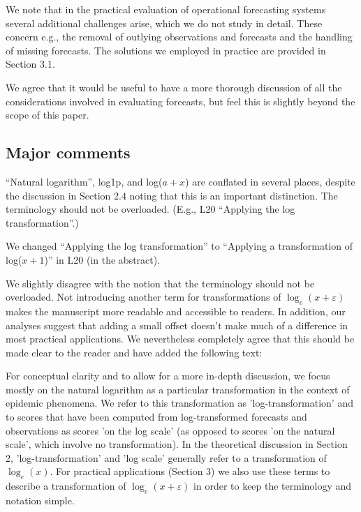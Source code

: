 \documentclass{article}
\newcommand{\black}{\color{black}}
\newcommand{\blue}{\color{blue}}
\newcommand{\indented}{\setlength{\leftskip}{1cm}}
\newcommand{\notindented}{\setlength{\leftskip}{0cm}}
\begin{document}
\indented
We note that in the practical evaluation of operational forecasting systems  several additional challenges arise, which we do not study in detail. These concern e.g., the removal of outlying observations and forecasts and the handling of missing forecasts. The solutions we employed in practice are provided in Section 3.1.
\notindented

We agree that it would be useful to have a more thorough discussion of all the considerations involved in evaluating forecasts, but feel this is slightly beyond the scope of this paper. 

\blue
\subsection{Major comments}

``Natural logarithm'', log1p, and log($a + x$) are conflated in several places, despite the discussion in Section 2.4 noting that this is an important distinction. The terminology should not be overloaded. (E.g., L20 ``Applying the log transformation''.)

\black
We changed ``Applying the log transformation'' to ``Applying a transformation of log($x + 1$)'' in L20 (in the abstract). 

We slightly disagree with the notion that the terminology should not be overloaded. Not introducing another term for transformations of $\log_{e}(x + \varepsilon)$ makes the manuscript more readable and accessible to readers. In addition, our analyses suggest that adding a small offset doesn't make much of a difference in most practical applications. We nevertheless completely agree that this should be made clear to the reader and have added the following text: 

\indented
For conceptual clarity and to allow for a more in-depth discussion, we focus mostly on the natural logarithm as a particular transformation in the context of epidemic phenomena. We refer to this transformation as 'log-transformation' and to scores that have been computed from log-transformed forecasts and observations as scores 'on the log scale' (as opposed to scores 'on the natural scale', which involve no transformation). In the theoretical discussion in Section 2, 'log-transformation' and 'log scale' generally refer to a transformation of $\log_{e}(x)$. For practical applications (Section 3) we also use these terms to describe a transformation of $\log_{e}(x + \varepsilon)$ in order to keep the terminology and notation simple.
\end{document}
